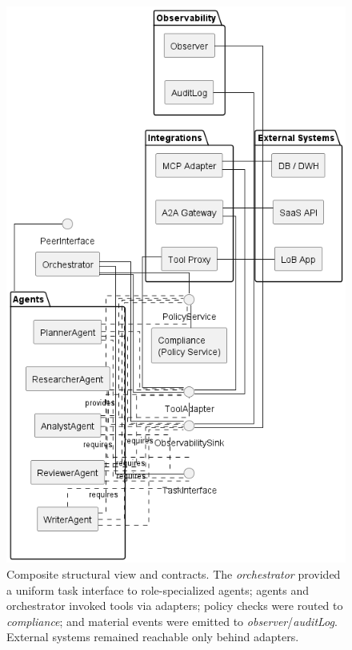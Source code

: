 \begin{figure}[H]
  \centering
  \includegraphics[width=0.5\linewidth]{ressources/MAS/figures/5_2_struct_overview.png}
  \caption{Composite structural view and contracts. The \emph{orchestrator} provided a uniform task interface to role-specialized agents; agents and orchestrator invoked tools via adapters; policy checks were routed to \emph{compliance}; and material events were emitted to \emph{observer}/\emph{auditLog}. External systems remained reachable only behind adapters.}\label{fig:5.2-struct-overview}
\end{figure}

